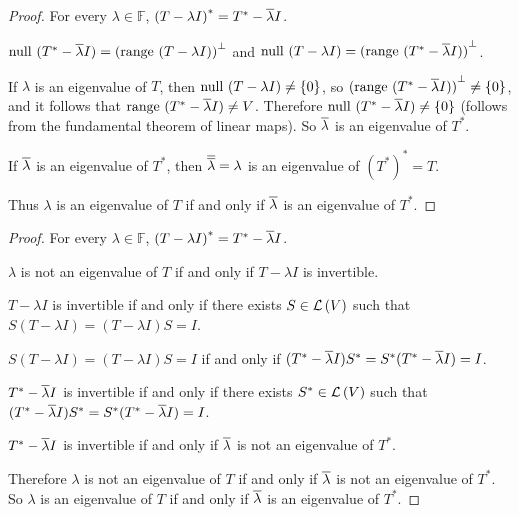 \begin{proof}
    For every $\lambda\in\mathbb{F}$, ${(T - \lambda I)}^{*} = T^{*} - \overline{\lambda}I$.

    $\operatorname{null}\,{(T^{*} - \overline{\lambda}I)} = {(\operatorname{range}\,{(T - \lambda I)})}^{\bot}$ and $\operatorname{null}\,{(T - \lambda I)} = {(\operatorname{range}\,{(T^{*} - \overline{\lambda}I)})}^{\bot}$.

    If $\lambda$ is an eigenvalue of $T$, then $\operatorname{null}\,{(T - \lambda I)}\ne \{0\}$, so ${(\operatorname{range}\,{(T^{*} - \overline{\lambda}I)})}^{\bot}\ne \{0\}$, and it follows that ${\operatorname{range}\,{(T^{*} - \overline{\lambda}I)}}\ne V$. Therefore $\operatorname{null}\,{(T^{*} - \overline{\lambda} I)}\ne \{0\}$ (follows from the fundamental theorem of linear maps). So $\overline{\lambda}$ is an eigenvalue of $T^{*}$.

    \bigskip

    If $\overline{\lambda}$ is an eigenvalue of $T^{*}$, then $\overline{\overline{\lambda}} = \lambda$ is an eigenvalue of ${(T^{*})}^{*} = T$.

    \bigskip

    Thus $\lambda$ is an eigenvalue of $T$ if and only if $\overline{\lambda}$ is an eigenvalue of $T^{*}$.
\end{proof}

\begin{proof}
    For every $\lambda\in\mathbb{F}$, ${(T - \lambda I)}^{*} = T^{*} - \overline{\lambda}I$.

    $\lambda$ is not an eigenvalue of $T$ if and only if $T - \lambda I$ is invertible.

    $T - \lambda I$ is invertible if and only if there exists $S\in\mathcal{L}\left({V}\right)$ such that $S(T - \lambda I) = (T - \lambda I)S = I$.

    $S(T - \lambda I) = (T - \lambda I)S = I$ if and only if $(T^{*} - \overline{\lambda}I)S^{*} = S^{*}(T^{*} - \overline{\lambda}I) = I$.

    $T^{*} - \overline{\lambda} I$ is invertible if and only if there exists $S^{*}\in\mathcal{L}\left({V}\right)$ such that $(T^{*} - \overline{\lambda}I)S^{*} = S^{*}(T^{*} - \overline{\lambda}I) = I$.

    $T^{*} - \overline{\lambda} I$ is invertible if and only if $\overline{\lambda}$ is not an eigenvalue of $T^{*}$.

    Therefore $\lambda$ is not an eigenvalue of $T$ if and only if $\overline{\lambda}$ is not an eigenvalue of $T^{*}$. So $\lambda$ is an eigenvalue of $T$ if and only if $\overline{\lambda}$ is an eigenvalue of $T^{*}$.
\end{proof}
\newpage

